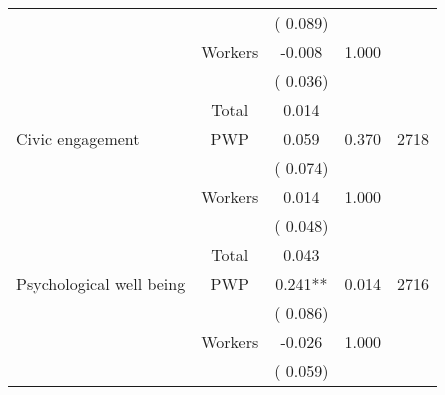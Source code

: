 \begin{tabular}{l*{4}{c}}
                               &                               &       (       0.089)                     & &                                                                             \\ 
                               &       Workers         &             -0.008               &        1.000   &                                               \\ 
                               &                               &       (       0.036)                     & &                                                                             \\ 
\cmidrule{2-3}
                               &       Total           &              0.014                 &    &                                               \\ 
\cmidrule{2-3}
 Civic engagement                 &       PWP     &              0.059               &        0.370   & 2718                              \\ 
                               &                               &       (       0.074)                     & &                                                                             \\ 
                               &       Workers         &              0.014               &        1.000   &                                               \\ 
                               &                               &       (       0.048)                     & &                                                                             \\ 
\cmidrule{2-3}
                               &       Total           &              0.043                 &    &                                               \\ 
\cmidrule{2-3}
 Psychological well being                &       PWP     &              0.241**               &       0.014    & 2716                              \\ 
                               &                               &       (       0.086)                     & &                                                                             \\ 
                               &       Workers         &             -0.026               &        1.000   &                                               \\ 
                               &                               &       (       0.059)                     & &                                                                             \\ 

\end{tabular}
